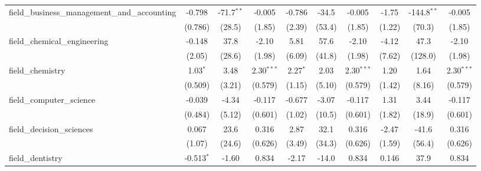\begin{tabular}{lccccccccc}
   field\_business\_management\_and\_accounting                & -0.798         & -71.7$^{**}$   & -0.005        & -0.786        & -34.5          & -0.005        & -1.75          & -144.8$^{**}$ & -0.005\\   
                                                               & (0.786)        & (28.5)         & (1.85)        & (2.39)        & (53.4)         & (1.85)        & (1.22)         & (70.3)        & (1.85)\\   
   field\_chemical\_engineering                                & -0.148         & 37.8           & -2.10         & 5.81          & 57.6           & -2.10         & -4.12          & 47.3          & -2.10\\   
                                                               & (2.05)         & (28.6)         & (1.98)        & (6.09)        & (41.8)         & (1.98)        & (7.62)         & (128.0)       & (1.98)\\   
   field\_chemistry                                            & 1.03$^{*}$     & 3.48           & 2.30$^{***}$  & 2.27$^{*}$    & 2.03           & 2.30$^{***}$  & 1.20           & 1.64          & 2.30$^{***}$\\   
                                                               & (0.509)        & (3.21)         & (0.579)       & (1.15)        & (5.10)         & (0.579)       & (1.42)         & (8.16)        & (0.579)\\   
   field\_computer\_science                                    & -0.039         & -4.34          & -0.117        & -0.677        & -3.07          & -0.117        & 1.31           & 3.44          & -0.117\\   
                                                               & (0.484)        & (5.12)         & (0.601)       & (1.02)        & (10.5)         & (0.601)       & (1.82)         & (18.9)        & (0.601)\\   
   field\_decision\_sciences                                   & 0.067          & 23.6           & 0.316         & 2.87          & 32.1           & 0.316         & -2.47          & -41.6         & 0.316\\   
                                                               & (1.07)         & (24.6)         & (0.626)       & (3.49)        & (34.3)         & (0.626)       & (1.59)         & (56.4)        & (0.626)\\   
   field\_dentistry                                            & -0.513$^{*}$   & -1.60          & 0.834         & -2.17         & -14.0          & 0.834         & 0.146          & 37.9          & 0.834\\   

\end{tabular}
